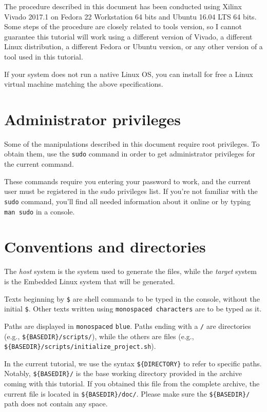 \documentclass[openany,a4paper]{book}
\begin{document}
The procedure described in this document has been conducted using Xilinx Vivado 2017.1 on Fedora 22 Workstation 64 bits and Ubuntu 16.04 LTS 64 bits.
Some steps of the procedure are closely related to tools version, so I cannot guarantee this tutorial will work using a different version of Vivado, a different Linux distribution, a different Fedora or Ubuntu version, or any other version of a tool used in this tutorial.

If your system does not run a native Linux OS, you can install for free a Linux virtual machine matching the above specifications.


\section{Administrator privileges}

Some of the manipulations described in this document require root privileges.
To obtain them, use the \texttt{sudo} command in order to get administrator privileges for the current command.

These commands require you entering your password to work, and the current user must be registered in the sudo privileges list.
If you're not familiar with the \texttt{sudo} command, you'll find all needed information about it online or by typing \texttt{man sudo} in a console.


\section{Conventions and directories}\label{section_directories}

The \textit{host} system is the system used to generate the files, while the \textit{target} system is the Embedded Linux system that will be generated.

Texts beginning by \texttt{\$} are shell commands to be typed in the console, without the initial \texttt{\$}.
Other texts written using \texttt{monospaced characters} are to be typed as it.

Paths are displayed in \nolinkurl{monospaced} \nolinkurl{blue}.
Paths ending with a \nolinkurl{/} are directories (e.g., \nolinkurl{${BASEDIR}/scripts/}), while the others are files (e.g., \nolinkurl{${BASEDIR}/scripts/initialize_project.sh}).

In the current tutorial, we use the syntax \nolinkurl{${DIRECTORY}} to refer to specific paths.
Notably, \nolinkurl{${BASEDIR}/} is the base working directory provided in the archive coming with this tutorial.
If you obtained this file from the complete archive, the current file is located in \nolinkurl{${BASEDIR}/doc/}.
Please make sure the \nolinkurl{${BASEDIR}/} path does not contain any space.
\end{document}
